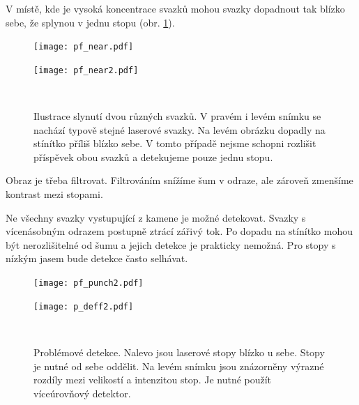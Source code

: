 V místě, kde je vysoká koncentrace svazků mohou svazky dopadnout tak blízko sebe, že splynou v jednu stopu (obr. \ref{Splynuti}).  

\begin{figure}[htbp]
    \centering
    \begin{minipage}[c]{0.48\textwidth}
        \centering\texttt{[image: pf\_near.pdf]}
    \end{minipage}
    \begin{minipage}[c]{0.48\textwidth}
        \centering\texttt{[image: pf\_near2.pdf]}
    \end{minipage}
    \\
        \caption[Slynutí dvou různých svazků.]{Ilustrace slynutí dvou různých svazků. V pravém i levém snímku se nachází typově stejné laserové svazky. Na levém obrázku dopadly na stínítko příliš blízko sebe. V tomto případě nejsme schopni rozlišit příspěvek obou svazků a detekujeme pouze jednu stopu.}
        \label{Splynuti}
\end{figure}

Obraz je třeba filtrovat. Filtrováním snížíme šum v odraze, ale zároveň zmenšíme kontrast mezi stopami. 

Ne všechny svazky vystupující z kamene je možné detekovat. Svazky s vícenásobným odrazem postupně ztrácí zářivý tok. Po dopadu na stínítko mohou být nerozlišitelné od šumu a jejich detekce je prakticky nemožná. Pro stopy s nízkým jasem bude detekce často selhávat.

\begin{figure}[htbp]
    \centering
    \begin{minipage}[c]{0.48\textwidth}
        \centering\texttt{[image: pf\_punch2.pdf]}
    \end{minipage}
    \begin{minipage}[c]{0.48\textwidth}
        \centering\texttt{[image: p\_deff2.pdf]}
    \end{minipage}
    \\
        \caption[Problémové detekce.]{Problémové detekce. Nalevo jsou laserové stopy blízko u sebe. Stopy je nutné od sebe oddělit. Na levém snímku jsou znázorněny výrazné rozdíly mezi velikostí a intenzitou stop. Je nutné použít víceúrovňový detektor. }
        \label{fig:Detekce}
\end{figure}

\newcommand\x{4}
\newcommand\xx{0,155}

